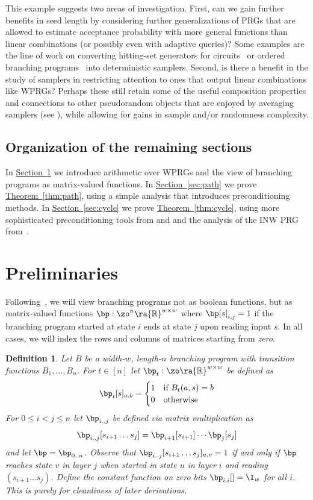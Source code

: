 \documentclass[11pt]{article}
\newcommand{\expref}[2]{\texorpdfstring{\hyperref[#2]{#1~\ref{#2}}}{#1~\ref{#2}}}
\newtheorem{definition}[theorem]{Definition}
\newcommand{\R}{{\mathbb R}}
\begin{document}
This example suggests two areas of investigation.  First, can we gain further benefits in seed length by considering further generalizations of PRGs that are allowed to estimate acceptance probability with more general functions than linear combinations (or possibly even with adaptive queries)?  Some examples are the
line of work on converting hitting-set generators for circuits~\cite{AndreevClRo98,AndreevClRoTr99,BuhrmanFo99,GoldreichVaWi11} or ordered branching programs~\cite{ChengHo20} into deterministic samplers.
Second, is there a benefit in the study of samplers in restricting attention to ones that output linear combinations like WPRGs?  Perhaps these still %
retain  %
some of the useful composition properties and connections to other pseudorandom objects that are enjoyed by averaging samplers %
(see  %
\cite{Zuckerman97,vadhan2012pseudorandomness,Agrawal19}), while allowing for gains in sample and/or randomness complexity.

\subsection{Organization of the remaining sections}
In \expref{Section}{sec:prelim} we introduce arithmetic over WPRGs and the view of branching programs as %
matrix-valued  %
functions. In \expref{Section}{sec:path} we prove \expref{Theorem}{thm:path}, using a simple analysis that introduces preconditioning methods. In \expref{Section}{sec:cycle} we prove \expref{Theorem}{thm:cycle}, using more sophisticated preconditioning tools from \cite{AhmadinejadKeMuPeSiVa19} and \cite{CKPPRSV17} and the analysis of the INW PRG from~\cite{HozaPyVa21}.

\section{Preliminaries}\label{sec:prelim}
Following~\cite{ReingoldStVa13}, we will view branching programs not as boolean functions, but as matrix-valued functions $\bp:\zo^n\ra\R^{w\times w}$ where $\bp[s]_{i,j}=1$ if the branching program started at state $i$ ends at state $j$ upon reading input $s$. In all cases, we will index the rows and columns of matrices starting from \emph{zero}.

\begin{definition}
Let $B$ be a width-$w$, length-$n$ branching program with transition functions $B_1,\ldots,B_n$. For $t\in [n]$ let $\bp_t:\zo\ra \R^{w\times w}$ be defined as
\[\bp_t[s]_{a,b} = \begin{cases}   
1 & \text{if } B_t(a,s)=b\\
0 & \text{otherwise}
\end{cases}\]
For $0\leq i<j\leq n$ let $\bp_{i..j}$ be defined via matrix multiplication as 
\[\bp_{i..j}[s_{i+1}\dots s_{j}]=\bp_{i+1}[s_{i+1}]\cdots\bp_j[s_j]\]
and let $\bp=\bp_{0..n}$. Observe that $\bp_{i..j}[s_{i+1}\dots s_j]_{u,v}=1$ if and only if $\bp$ reaches state $v$ in layer $j$ when started in state $u$ in layer $i$ and reading $(s_{i+1}\dots s_j)$. Define the constant function on zero bits $\bp_{i,i}[]=\I_w$ for all $i$. This is purely for cleanliness of later derivations.
\end{definition}
\end{document}
